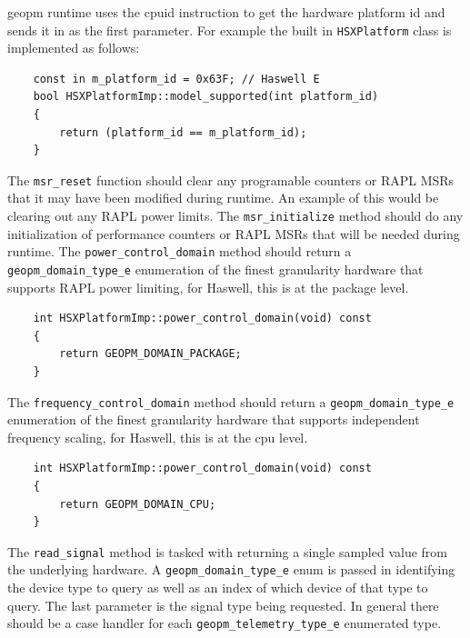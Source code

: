 \documentclass[11pt]{article}
\begin{document}
geopm runtime uses the cpuid instruction to get the hardware platform
id and sends it in as the first parameter. For example the built in
\verb#HSXPlatform# class is implemented as follows:
\begin{verbatim}
    const in m_platform_id = 0x63F; // Haswell E
    bool HSXPlatformImp::model_supported(int platform_id)
    {
        return (platform_id == m_platform_id);
    }
\end{verbatim}
The \verb#msr_reset# function should clear any programable counters or
RAPL MSRs that it may have been modified during runtime. An example of
this would be clearing out any RAPL power limits.  The
\verb#msr_initialize# method should do any initialization of
performance counters or RAPL MSRs that will be needed during runtime.
The \verb#power_control_domain# method should return a
\verb#geopm_domain_type_e# enumeration of the finest granularity
hardware that supports RAPL power limiting, for Haswell, this is at
the package level.
\begin{verbatim}
    int HSXPlatformImp::power_control_domain(void) const
    {
        return GEOPM_DOMAIN_PACKAGE;
    }
\end{verbatim}
The \verb#frequency_control_domain# method should return a
\verb#geopm_domain_type_e# enumeration of the finest granularity
hardware that supports independent frequency scaling, for Haswell,
this is at the cpu level.
\begin{verbatim}
    int HSXPlatformImp::power_control_domain(void) const
    {
        return GEOPM_DOMAIN_CPU;
    }
\end{verbatim}
The \verb#read_signal# method is tasked with returning a single
sampled value from the underlying hardware. A
\verb#geopm_domain_type_e# enum is passed in identifying the device
type to query as well as an index of which device of that type to
query. The last parameter is the signal type being requested. In
general there should be a case handler for each
\verb#geopm_telemetry_type_e# enumerated type.
\end{document}
